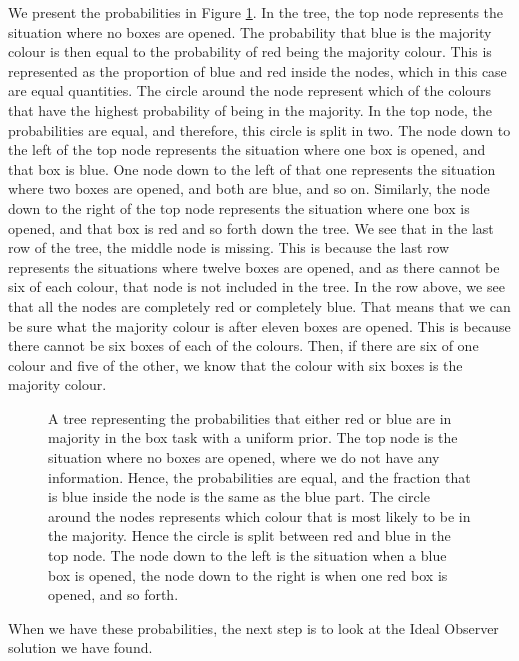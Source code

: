 We present the probabilities in Figure \ref{fig:probability_gamma_kappa_1}. In the tree, the top node represents the situation where no boxes are opened. The probability that blue is the majority colour is then equal to the probability of red being the majority colour. This is represented as the proportion of blue and red inside the nodes, which in this case are equal quantities. The circle around the node represent which of the colours that have the highest probability of being in the majority. In the top node, the probabilities are equal, and therefore, this circle is split in two. The node down to the left of the top node represents the situation where one box is opened, and that box is blue. One node down to the left of that one represents the situation where two boxes are opened, and both are blue, and so on. Similarly, the node down to the right of the top node represents the situation where one box is opened, and that box is red and so forth down the tree. We see that in the last row of the tree, the middle node is missing. This is because the last row represents the situations where twelve boxes are opened, and as there cannot be six of each colour, that node is not included in the tree. In the row above, we see that all the nodes are completely red or completely blue. That means that we can be sure what the majority colour is after eleven boxes are opened. This is because there cannot be six boxes of each of the colours. Then, if there are six of one colour and five of the other, we know that the colour with six boxes is the majority colour. 
\begin{figure}
    \centering
    \scalebox{0.4}{}
    \caption[The probabilities of majority colour plotted. $\gamma=\kappa=1$]{A tree representing the probabilities that either red or blue are in majority in the box task with a uniform prior. The top node is the situation where no boxes are opened, where we do not have any information. Hence, the probabilities are equal, and the fraction that is blue inside the node is the same as the blue part. The circle around the nodes represents which colour that is most likely to be in the majority. Hence the circle is split between red and blue in the top node. The node down to the left is the situation when a blue box is opened, the node down to the right is when one red box is opened, and so forth.}
    \label{fig:probability_gamma_kappa_1}
\end{figure}

When we have these probabilities, the next step is to look at the Ideal Observer solution we have found.




